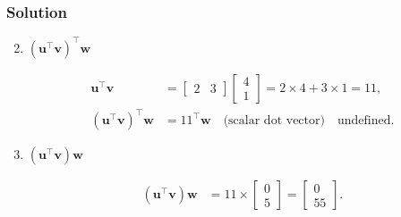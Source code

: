 \documentclass{beamer}
\theoremstyle{remark}
\numberwithin{equation}{section}
\begin{document}
\begin{frame}[fragile]
    \frametitle{Solution}
\begin{enumerate}[label=\alph*) ]
\setcounter{enumi}{1} 
    \[
\mathbf{u}^\top (\mathbf{v} \times \mathbf{w}) =
\begin{bmatrix} 2 & 3 & 0 \end{bmatrix}
\begin{bmatrix}
0 \\
0 \\
20
\end{bmatrix} = 0
\]
Since the scalar (dot) product of two vectors is defined, the expression  \(\mathbf{u} ^\top(\mathbf{v} \times \mathbf{w})\) is meaningful.
  \item \( (\mathbf{u}^\top \mathbf{v})^\top \mathbf{w} \)

  \begin{align*}
  \mathbf{u}^\top \mathbf{v} &= \begin{bmatrix} 2 & 3 \end{bmatrix} \begin{bmatrix} 4 \\ 1 \end{bmatrix} = 2 \times 4 + 3 \times 1 = 11,
  \\
  (\mathbf{u}^\top \mathbf{v})^\top \mathbf{w} &= 11^\top \mathbf{w} \quad \text{(scalar dot vector)} \quad \text{undefined}.
  \end{align*}

  \item \( (\mathbf{u}^\top \mathbf{v}) \mathbf{w} \)

  \begin{align*}
  (\mathbf{u}^\top \mathbf{v}) \mathbf{w} &= 11 \times \begin{bmatrix} 0 \\ 5 \end{bmatrix} = \begin{bmatrix} 0 \\ 55 \end{bmatrix}.
  \end{align*}
\end{enumerate}

\end{frame}
\end{document}
